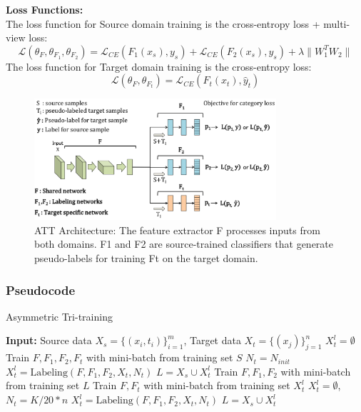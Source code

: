 \documentclass{article}
\begin{document}
\textbf{Loss Functions:}\\
 The loss function for Source domain training is the cross-entropy loss + multi-view loss:
\[
  \mathcal{L}(\theta_F, \theta_{F_1}, \theta_{F_2}) = \mathcal{L}_{CE}(F_1(x_s), {y}_s) + 
  \mathcal{L}_{CE}(F_2(x_s), {y}_s) + \lambda
  \|W_1^T W_2\|
\]
The loss function for Target domain training is the cross-entropy loss:
\[
  \mathcal{L}(\theta_F, \theta_{F_t}) = \mathcal{L}_{CE}(F_t(x_t), \hat{y}_t)
\]

\begin{figure}
  \centering
  \includegraphics[width=0.8\textwidth]{ATT/ATT_Architecture.png}
  \caption{ATT Architecture: The feature extractor F processes inputs from both domains. F1 and F2 are source-trained classifiers that generate pseudo-labels for training Ft on the target domain.}
  \label{fig:att_architecture}
\end{figure}

\subsubsection{Pseudocode}
\begin{algorithm}[H]
\caption{Asymmetric Tri-training}
\begin{algorithmic}[1]
\STATE \textbf{Input:} Source data $X_s = \{(x_i, t_i)\}_{i=1}^m$, Target data $X_t = \{(x_j)\}_{j=1}^n$
\STATE $X_t^l = \emptyset$ 
  \STATE Train $F, F_1, F_2, F_t$ with mini-batch from training set $S$
\ENDFOR
\STATE $N_t = N_{init}$
\STATE $X_t^l = \text{Labeling}(F, F_1, F_2, X_t, N_t)$
\STATE $L = X_s \cup X_t^l$
    \STATE Train $F, F_1, F_2$ with mini-batch from training set $L$
    \STATE Train $F, F_t$ with mini-batch from training set $X_t^l$
  \ENDFOR
  \STATE $X_t^l = \emptyset$, $N_t = K/20 * n$
  \STATE $X_t^l = \text{Labeling}(F, F_1, F_2, X_t, N_t)$
  \STATE $L = X_s \cup X_t^l$
\ENDFOR
\end{algorithmic}
\end{algorithm}
\end{document}
